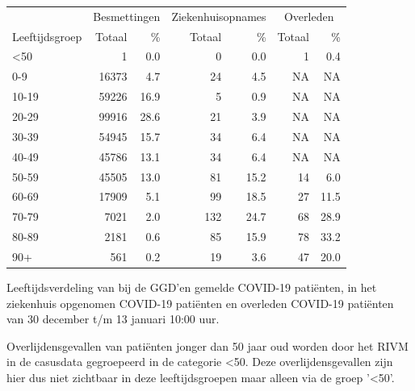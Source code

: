 \documentclass[
  english,
  man,floatsintext]{apa6}
\begin{document}
\begin{table}
\centering\begingroup\fontsize{11}{13}\selectfont

\begin{threeparttable}
\begin{tabular}{lrrrrrr}
\toprule
\multicolumn{1}{c}{ } & \multicolumn{2}{c}{Besmettingen} & \multicolumn{2}{c}{Ziekenhuisopnames} & \multicolumn{2}{c}{Overleden} \\
\cmidrule(l{3pt}r{3pt}){2-3} \cmidrule(l{3pt}r{3pt}){4-5} \cmidrule(l{3pt}r{3pt}){6-7}
Leeftijdsgroep & Totaal & \% & Totaal & \% & Totaal & \%\\
\midrule
<50 & 1 & 0.0 & 0 & 0.0 & 1 & 0.4\\
0-9 & 16373 & 4.7 & 24 & 4.5 & NA & NA\\
10-19 & 59226 & 16.9 & 5 & 0.9 & NA & NA\\
20-29 & 99916 & 28.6 & 21 & 3.9 & NA & NA\\
30-39 & 54945 & 15.7 & 34 & 6.4 & NA & NA\\
40-49 & 45786 & 13.1 & 34 & 6.4 & NA & NA\\
50-59 & 45505 & 13.0 & 81 & 15.2 & 14 & 6.0\\
60-69 & 17909 & 5.1 & 99 & 18.5 & 27 & 11.5\\
70-79 & 7021 & 2.0 & 132 & 24.7 & 68 & 28.9\\
80-89 & 2181 & 0.6 & 85 & 15.9 & 78 & 33.2\\
90+ & 561 & 0.2 & 19 & 3.6 & 47 & 20.0\\
\bottomrule
\end{tabular}
\begin{tablenotes}
\item[1] Leeftijdsverdeling van bij de GGD’en gemelde COVID-19 patiënten, in het ziekenhuis opgenomen COVID-19 patiënten en overleden COVID-19 patiënten van 30 december t/m 13 januari 10:00 uur.
\item[2] Overlijdensgevallen van patiënten jonger dan 50 jaar oud worden door het RIVM in de casusdata gegroepeerd in de categorie <50. Deze overlijdensgevallen zijn hier dus niet zichtbaar in deze leeftijdsgroepen maar alleen via de groep '<50'.
\end{tablenotes}
\end{threeparttable}
\endgroup{}
\end{table}

\newpage
\end{document}
